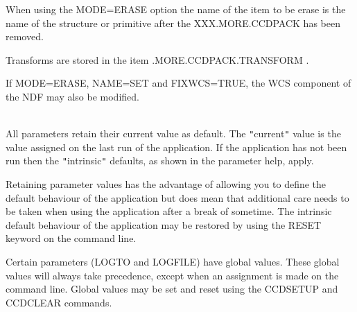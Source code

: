 \documentclass[twoside,11pt]{article}
\newcommand{\htmlref}[2]{#1}
\renewcommand{\_}{\texttt{\symbol{95}}}
\newcommand{\qt}[1]{{\tt "}#1{\tt "}}
\newcommand{\xroutine}[1]{\htmlref{{\sc #1}}{#1}}
\newcommand{\sstdiytopic}[2]{\item[#1:] \mbox{} \\[1.3ex] #2}
\newcommand{\sstitem}{\item}
\newcommand{\sstdiytopic}[2]{\item[{#1:}] #2 }
\newcommand{\sstitem}{\item}
\begin{document}
{{{         \sstitem
         When using the MODE=ERASE option the name of the item to be
           erase is the name of the structure or primitive after the
           XXX.MORE.CCDPACK has been removed.

         \sstitem
         Transforms are stored in the item .MORE.CCDPACK.TRANSFORM .

         \sstitem
         If MODE=ERASE, NAME=SET and FIXWCS=TRUE, the WCS component
         of the NDF may also be modified.

      }
   }
   \sstdiytopic{
      Behaviour of parameters
   }{
      All parameters retain their current value as default. The
      \qt{current} value is the value assigned on the last run of the
      application. If the application has not been run then the
      \qt{intrinsic} defaults, as shown in the parameter help, apply.

      Retaining parameter values has the advantage of allowing you to
      define the default behaviour of the application but does mean
      that additional care needs to be taken when using the application
      after a break of sometime.  The intrinsic default behaviour of
      the application may be restored by using the RESET keyword on the
      command line.

      Certain parameters (LOGTO and LOGFILE) have global values. These
      global values will always take precedence, except when an
      assignment is made on the command line.  Global values may be set
      and reset using the \xroutine{CCDSETUP} and \xroutine{CCDCLEAR} commands.
   }
}
\end{document}
